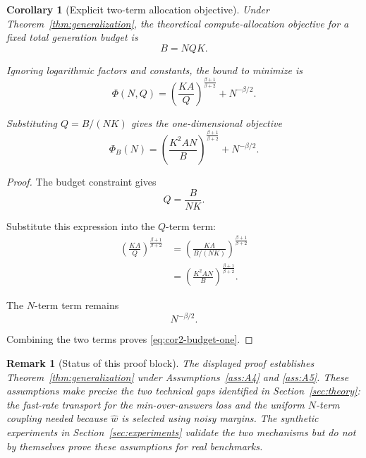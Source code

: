 \documentclass{article} %
\newtheorem{corollary}[theorem]{Corollary}
\newtheorem{remark}{Remark}
\providecommand{\what}{\widehat{w}}
\begin{document}
\begin{corollary}[Explicit two-term allocation objective]
\label{cor:app2-allocation-objective}
Under Theorem~\ref{thm:generalization}, the theoretical compute-allocation
objective for a fixed total generation budget is
\begin{equation}
\label{eq:cor2-budget}
B
=
NQK .
\end{equation}

Ignoring logarithmic factors and constants, the bound to minimize is
\begin{equation}
\label{eq:cor2-budget-objective}
\Phi(N,Q)
=
\left(\frac{KA}{Q}\right)^{\frac{\beta+1}{\beta+2}}
+
N^{-\beta/2}.
\end{equation}

Substituting \(Q=B/(NK)\) gives the one-dimensional objective
\begin{equation}
\label{eq:cor2-budget-one}
\Phi_B(N)
=
\left(\frac{K^2AN}{B}\right)^{\frac{\beta+1}{\beta+2}}
+
N^{-\beta/2}.
\end{equation}
\end{corollary}

\begin{proof}
The budget constraint gives
\begin{equation}
\label{eq:cor2-budget-proof-Q}
Q
=
\frac{B}{NK}.
\end{equation}

Substitute this expression into the \(Q\)-term term:
\begin{align}
\left(\frac{KA}{Q}\right)^{\frac{\beta+1}{\beta+2}}
&=
\left(
\frac{KA}{B/(NK)}
\right)^{\frac{\beta+1}{\beta+2}}
\label{eq:cor2-budget-proof-a}
\\
&=
\left(
\frac{K^2AN}{B}
\right)^{\frac{\beta+1}{\beta+2}} .
\label{eq:cor2-budget-proof-b}
\end{align}

The \(N\)-term term remains
\begin{equation}
\label{eq:cor2-budget-proof-c}
N^{-\beta/2}.
\end{equation}

Combining the two terms proves \eqref{eq:cor2-budget-one}.
\end{proof}

\begin{remark}[Status of this proof block]
\label{rem:app2-status}
The displayed proof establishes Theorem~\ref{thm:generalization} under
Assumptions~\ref{ass:A4} and \ref{ass:A5}.  These assumptions make precise the
two technical gaps identified in Section~\ref{sec:theory}: the fast-rate
transport for the min-over-answers loss and the uniform \(N\)-term coupling
needed because \(\what\) is selected using noisy margins.  The synthetic
experiments in Section~\ref{sec:experiments} validate the two mechanisms but do
not by themselves prove these assumptions for real benchmarks.
\end{remark}
\end{document}
